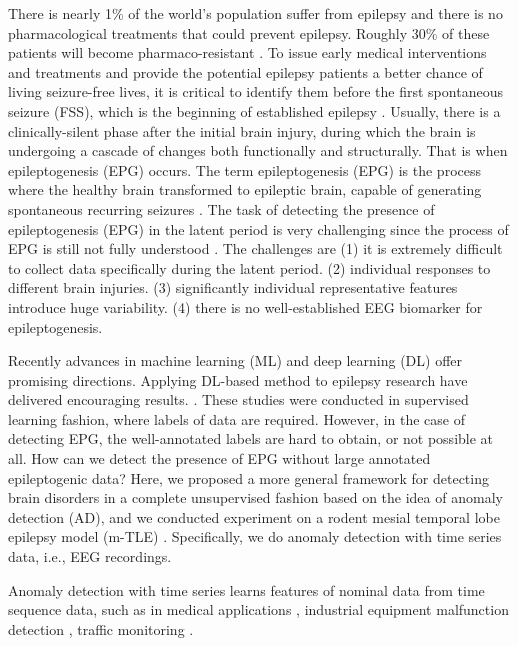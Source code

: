 \documentclass[pmlr]{jmlr}%
\begin{document}
There is nearly 1\% of the world's population suffer from epilepsy and there is no pharmacological treatments that could prevent epilepsy. Roughly 30\% of these patients will become pharmaco-resistant \citep{kwan2000early}. To issue early medical interventions and treatments and provide the potential epilepsy patients a better chance of living seizure-free lives, it is critical to identify them before the first spontaneous seizure (FSS), which is the beginning of established epilepsy \cite{moshe2015epilepsy}. 
Usually, there is a clinically-silent phase after the initial brain injury, during which the brain is undergoing a cascade of changes both functionally and structurally. That is when epileptogenesis (EPG) occurs. The term epileptogenesis (EPG) is the process where the healthy brain transformed to epileptic brain, capable of generating spontaneous recurring seizures \cite{loscher2019holy, pitkanen2014past}. 
The task of detecting the presence of epileptogenesis (EPG) in the latent period is very challenging since the process of EPG is still not fully understood \cite{pitkanen2016advances}. The challenges are (1) it is extremely difficult to collect data specifically during the latent period. (2) individual responses to different brain injuries. (3) significantly individual representative features introduce huge variability. (4) there is no well-established EEG biomarker for epileptogenesis.

Recently advances in machine learning (ML) and deep learning (DL) offer promising directions. Applying DL-based method to epilepsy research have delivered encouraging results. \cite{lu2020towards, lu2020staging, rizzi2019changes, MORE}. These studies were conducted in supervised learning fashion, where labels of data are required. However, in the case of detecting EPG, the well-annotated labels are hard to obtain, or not possible at all. How can we detect the presence of EPG without large annotated epileptogenic data?
Here, we proposed a more general framework for detecting brain disorders in a complete unsupervised fashion based on the idea of anomaly detection (AD), and we conducted experiment on a rodent mesial temporal lobe epilepsy model (m-TLE) \cite{costard2019electrical}. Specifically, we do anomaly detection with time series data, i.e., EEG recordings. 



Anomaly detection with time series learns features of nominal data from time sequence data, such as in medical applications \cite{zhou2019beatgan}, industrial equipment malfunction detection \cite{su2019robust}, traffic monitoring \cite{shipmon2017time}. 
\end{document}
